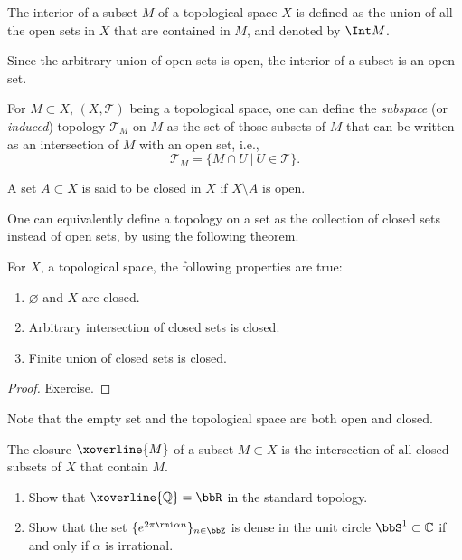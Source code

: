 \begin{defn}[Interior]
The interior of a subset $M$ of a topological space $X$ is defined as the union of all the open sets in $X$ that are contained in $M$, and denoted by $\Int M$.
\end{defn}
Since the arbitrary union of open sets is open, the interior of a subset is an open set.

\begin{defn}
For $M\subset X$, $(X,\mathcal{T})$ being a topological space, one can define the \emph{subspace} (or \emph{induced}) topology $\mathcal{T}_M$ on $M$ as the set of those subsets of $M$ that can be written as an intersection of $M$ with an open set, i.e.,
\begin{equation}
    \mathcal{T}_M = \{ M\cap U ~|~ U\in \mathcal{T} \}.
\end{equation}
\end{defn}

\begin{defn}
A set $A\subset X$ is said to be closed in $X$ if $X\setminus A$ is open.
\end{defn}

One can equivalently define a topology on a set as the collection of closed sets instead of open sets, by using the following theorem.

\begin{thm}
For $X$, a topological space, the following properties are true:
\begin{enumerate}
    \item $\varnothing$ and $X$ are closed.
    \item Arbitrary intersection of closed sets is closed.
    \item Finite union of closed sets is closed.
\end{enumerate}
\end{thm}
\begin{proof}
Exercise.
\end{proof}

Note that the empty set and the topological space are both open and closed.

\begin{defn}
The closure $\xoverline{M}$ of a subset $M\subset X$ is the intersection of all closed subsets of $X$ that contain $M$.
\end{defn}
\begin{xca}
\begin{enumerate}
    \item Show that $\xoverline{\mathbb{Q}}=\bbR $ in the standard topology.
    \item Show that the set $\{e^{2\pi\rmi \alpha n}\}_{n\in\bbZ}$ is dense in the unit circle $\bbS^1\subset \mathbb{C}$ if and only if $\alpha$ is irrational.
\end{enumerate}
\end{xca}

